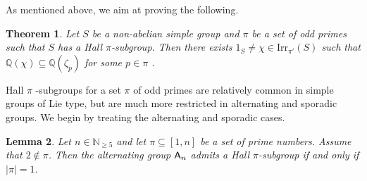\documentclass[12pt]{amsart}
\newtheorem{theorem}{Theorem}[section]
\newtheorem{lemma}[theorem]{Lemma}
\theoremstyle{definition}
\numberwithin{equation}{section}
\newcommand{\Irr}{{\mathrm {Irr}}}
\newcommand{\QQ}{{\mathbb Q}}
\newcommand{\Al}{\textup{\textsf{A}}}
\begin{document}
As mentioned above, we aim at %
proving the following.

\begin{theorem}\label{thm:simple}
Let %
$S$ be a non-abelian simple group and $\pi$ be a set of odd
primes such that $S$ has a Hall $\pi$-subgroup. Then %
there exists
$1_S\neq\chi\in\Irr_{\pi'}(S)$ %
such that
$\QQ(\chi)\subseteq\QQ(\zeta_p)$ for some $p\in\pi$%
.
\end{theorem}


Hall $\pi$%
-subgroups for a set $\pi$ of odd primes are relatively
common in simple groups of Lie type, but are much more restricted in
alternating and sporadic groups. We begin by treating the
alternating and sporadic cases.

\begin{lemma}\label{lem:noHall}
Let $n\in\mathbb{N}_{\geq 5}$ and %
let $\pi\subseteq [1,n]$ be a set
of prime numbers. Assume that $2\notin\pi$. Then the alternating
group $\Al_n$ admits a Hall $\pi$-subgroup if and only if $|\pi|=1$.
\end{lemma}
\end{document}
